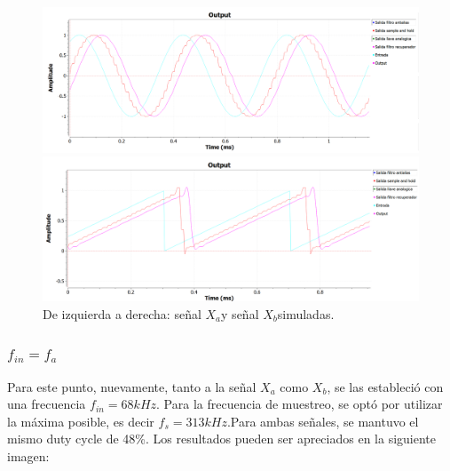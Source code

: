 \documentclass[../../ASSD_TP1_G7.tex]{subfiles}
\begin{document}
\begin{figure}[H]

\begin{centering}
\includegraphics[scale=0.5]{Imagenes/simulacion_syh_seno_b1}
\par\end{centering}
\begin{centering}
\includegraphics[scale=0.5]{Imagenes/simulacion_syh_diente_b1}\caption{De izquierda a derecha: señal $X_{a}$y señal $X_{b}$simuladas.}
\par\end{centering}
\end{figure}


\subsubsection{$f_{in}=f_{a}$}

Para este punto, nuevamente, tanto a la señal $X_{a}$ como $X_{b}$,
se las estableció con una frecuencia $f_{in}=68kHz$. Para la frecuencia
de muestreo, se optó por utilizar la máxima posible, es decir $f_{s}=313kHz.$Para
ambas señales, se mantuvo el mismo duty cycle de 48\%. Los resultados
pueden ser apreciados en la siguiente imagen:
\end{document}

